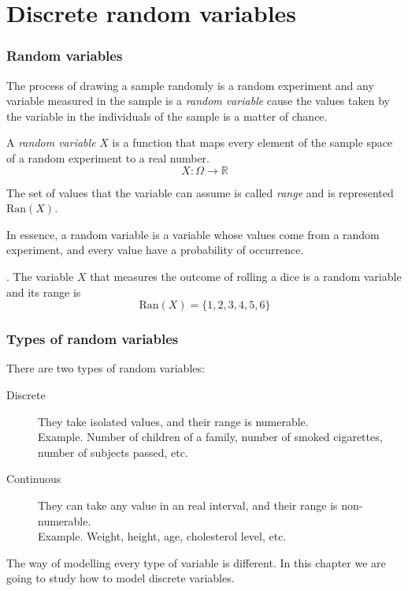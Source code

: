 \section{Discrete random variables}



\begin{frame}
\frametitle{Random variables}
The process of drawing a sample randomly is a random experiment and any variable measured in the sample is a
\emph{random variable} cause the values taken by the variable in the individuals of the sample is a matter of chance.

\begin{definition} 
A \emph{random variable} $X$ is a function that maps every element of the sample space of a random experiment to a real
number.
\[ 
X:\Omega \rightarrow \mathbb{R} 
\]

The set of values that the variable can assume is called \emph{range} and is represented $\mbox{Ran}(X)$.
\end{definition}

In essence, a random variable is a variable whose values come from a random experiment, and every value have
a probability of occurrence. 

. The variable $X$ that measures the outcome of rolling a dice is a random variable and its
range is 
\[
\mbox{Ran}(X)=\{1,2,3,4,5,6\}
\]
\end{frame}


\begin{frame}
\frametitle{Types of random variables}
There are two types of random variables:
\begin{description}
\item[Discrete] They take isolated values, and their range is numerable.\\
Example. Number of children of a family, number of smoked cigarettes, number of subjects passed, etc.
\item[Continuous] They can take any value in an real interval, and their range is non-numerable.\\
Example. Weight, height, age, cholesterol level, etc. 
\end{description}

The way of modelling every type of variable is different. 
In this chapter we are going to study how to model discrete variables.
\end{frame}



